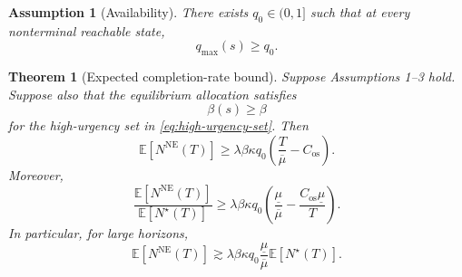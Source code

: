 \documentclass[11pt]{article}
\newtheorem{theorem}{Theorem}
\newtheorem{assumption}{Assumption}
\newcommand{\E}{\mathbb{E}}
\begin{document}
\begin{assumption}[Availability]
There exists $q_0\in(0,1]$ such that at every nonterminal reachable state,
\begin{equation}
  q_{\max}(s)\ge q_0.
  \label{eq:q0-assumption}
\end{equation}
\end{assumption}

\begin{theorem}[Expected completion-rate bound]\label{thm:completion-rate-bound}
Suppose Assumptions 1--3 hold. Suppose also that the equilibrium allocation satisfies
\begin{equation}
  \beta(s)\ge \beta
  \label{eq:beta-uniform}
\end{equation}
for the high-urgency set in \eqref{eq:high-urgency-set}. Then
\begin{equation}
  \E[N^{\mathrm{NE}}(T)]
  \ge
  \lambda\beta\kappa q_0
  \left(\frac{T}{\overline\mu}-C_{\mathrm{os}}\right).
  \label{eq:ne-completions-lower}
\end{equation}
Moreover,
\begin{equation}
  \frac{\E[N^{\mathrm{NE}}(T)]}{\E[N^\star(T)]}
  \ge
  \lambda\beta\kappa q_0
  \left(
    \frac{\underline\mu}{\overline\mu}
    -
    \frac{C_{\mathrm{os}}\underline\mu}{T}
  \right).
  \label{eq:main-ratio-bound}
\end{equation}
In particular, for large horizons,
\begin{equation}
  \E[N^{\mathrm{NE}}(T)]
  \gtrsim
  \lambda\beta\kappa q_0
  \frac{\underline\mu}{\overline\mu}
  \E[N^\star(T)].
  \label{eq:asymptotic-bound}
\end{equation}
\end{theorem}
\end{document}
